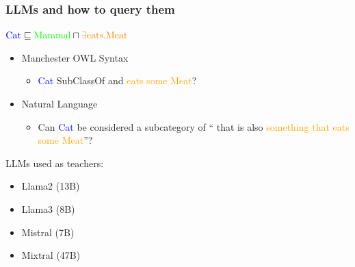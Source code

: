\documentclass[handout]{beamer}\mode<handout>{\usetheme{AMSBolognaFC}}
\begin{document}
\begin{frame}[c,allowframebreaks]
\frametitle{LLMs and how to query them}

    $\textcolor{blue}{\text{Cat}} \sqsubseteq \textcolor{green}{\text{Mammal}} \sqcap \textcolor{orange}{\exists \text{eats.Meat}}$

    \begin{itemize}
        \item Manchester OWL Syntax
        \begin{itemize}
            \item \textcolor{blue}{Cat} SubClassOf \textcolor{green}{} and \textcolor{orange}{eats some Meat}?
        \end{itemize}
        \item Natural Language
        \begin{itemize}
            \item Can \textcolor{blue}{Cat} be considered a subcategory of ``\textcolor{green}{} that is also \textcolor{orange}{something that eats some Meat}''?
        \end{itemize}
    \end{itemize}

    \vspace{1cm}

    LLMs used as teachers:

    \begin{itemize}
        \item Llama2 (13B)
        \item Llama3 (8B)
        \item Mistral (7B)
        \item Mixtral (47B)
    \end{itemize}

    \framebreak


\end{frame}
\end{document}
